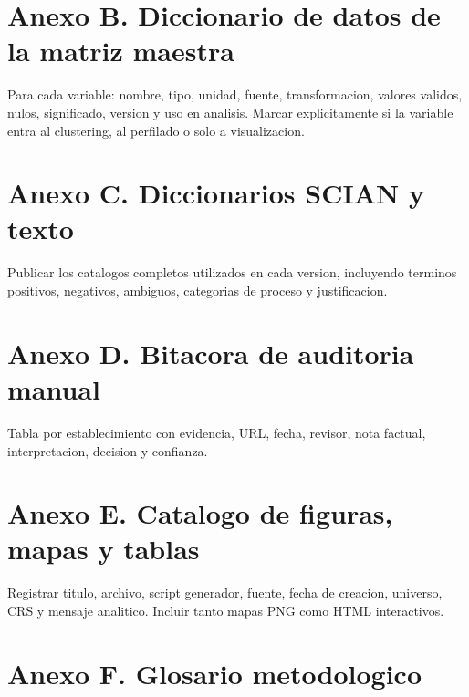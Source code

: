 \documentclass[11pt,letterpaper]{article}
\begin{document}
\section{Anexo B. Diccionario de datos de la matriz maestra}

Para cada variable: nombre, tipo, unidad, fuente, transformacion, valores validos, nulos, significado, version y uso en analisis. Marcar explicitamente si la variable entra al clustering, al perfilado o solo a visualizacion.

\section{Anexo C. Diccionarios SCIAN y texto}

Publicar los catalogos completos utilizados en cada version, incluyendo terminos positivos, negativos, ambiguos, categorias de proceso y justificacion.

\section{Anexo D. Bitacora de auditoria manual}

Tabla por establecimiento con evidencia, URL, fecha, revisor, nota factual, interpretacion, decision y confianza.

\section{Anexo E. Catalogo de figuras, mapas y tablas}

Registrar titulo, archivo, script generador, fuente, fecha de creacion, universo, CRS y mensaje analitico. Incluir tanto mapas PNG como HTML interactivos.

\section{Anexo F. Glosario metodologico}
\end{document}
